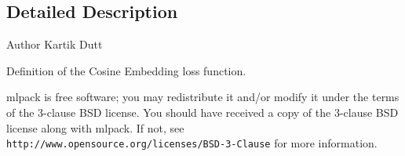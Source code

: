 \subsection{Detailed Description}
\begin{DoxyAuthor}{Author}
Kartik Dutt
\end{DoxyAuthor}
Definition of the Cosine Embedding loss function.

mlpack is free software; you may redistribute it and/or modify it under the terms of the 3-\/clause B\+SD license. You should have received a copy of the 3-\/clause B\+SD license along with mlpack. If not, see {\tt http\+://www.\+opensource.\+org/licenses/\+B\+S\+D-\/3-\/\+Clause} for more information. 
